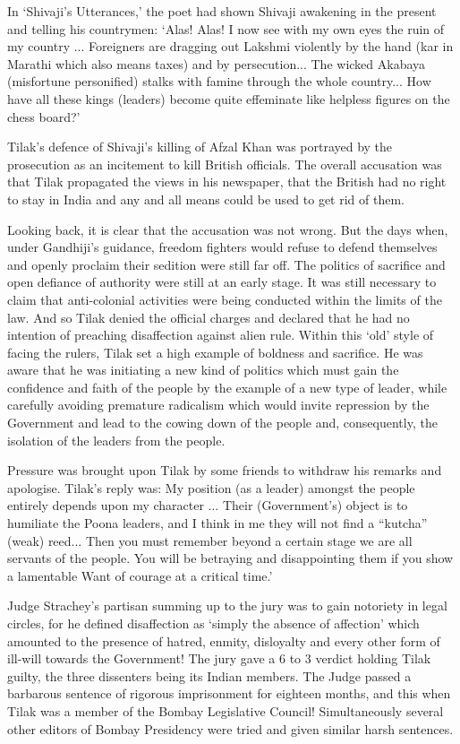 In `Shivaji's Utterances,' the poet had shown Shivaji awakening in the present and telling his countrymen: `Alas! Alas! I now see with my own eyes the ruin of my country ... Foreigners are dragging out Lakshmi violently by the hand (kar in Marathi which also means taxes) and by persecution... The wicked Akabaya (misfortune personified) stalks with famine through the whole country... How have all these kings (leaders) become quite effeminate like helpless figures on the chess­ board?'

Tilak's defence of Shivaji's killing of Afzal Khan was portrayed by the prosecution as an incitement to kill British officials. The overall accusation was that Tilak propagated the views in his newspaper, that the British had no right to stay in India and any and all means could be used to get rid of them.

Looking back, it is clear that the accusation was not wrong. But the days when, under Gandhiji's guidance, freedom fighters would refuse to defend themselves and openly proclaim their sedition were still far off. The politics of sacrifice and open defiance of authority were still at an early stage. It was still necessary to claim that anti-colonial activities were being conducted within the limits of the law. And so Tilak denied the official charges and declared that he had no intention of preaching disaffection against alien rule. Within this `old' style of facing the rulers, Tilak set a high example of boldness and sacrifice. He was aware that he was initiating a new kind of politics which must gain the confidence and faith of the people by the example of a new type of leader, while carefully avoiding premature radicalism which would invite repression by the Government and lead to the cowing down of the people and, consequently, the isolation of the leaders from the people.

Pressure was brought upon Tilak by some friends to withdraw his remarks and apologise. Tilak's reply was: My position (as a leader) amongst the people entirely depends upon my character ... Their (Government's) object is to humiliate the Poona leaders, and I think in me they will not find a ``kutcha'' (weak) reed... Then you must remember beyond a certain stage we are all servants of the people. You will be betraying and disappointing them if you show a lamentable Want of courage at a critical time.'

Judge Strachey's partisan summing up to the jury was to gain notoriety in legal circles, for he defined disaffection as `simply the absence of affection' which amounted to the presence of hatred, enmity, disloyalty and every other form of ill-will towards the Government! The jury gave a 6 to 3 verdict holding Tilak guilty, the three dissenters being its Indian members. The Judge passed a barbarous sentence of rigorous imprisonment for eighteen months, and this when Tilak was a member of the Bombay Legislative Council! Simultaneously several other editors of Bombay Presidency were tried and given similar harsh sentences.

